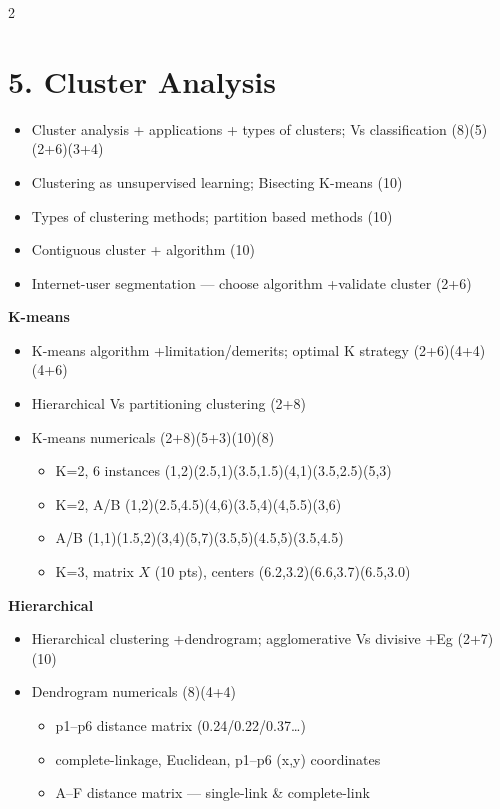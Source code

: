\documentclass[10pt]{article}
\begin{document}
\begin{multicols}{2}
\section*{5. Cluster Analysis}
\begin{itemize}
  \item Cluster analysis + applications + types of clusters; Vs classification \hfill (8)(5)(2+6)(3+4)
  \item Clustering as unsupervised learning; Bisecting K-means \hfill (10)
  \item Types of clustering methods; partition based methods \hfill (10)
  \item Contiguous cluster + algorithm \hfill (10)
  \item Internet-user segmentation --- choose algorithm +validate cluster \hfill (2+6)
\end{itemize}
\textbf{K-means}
\begin{itemize}
  \item K-means algorithm +limitation/demerits; optimal K strategy \hfill (2+6)(4+4)(4+6)
  \item Hierarchical Vs partitioning clustering \hfill (2+8)
  \item K-means numericals \hfill (2+8)(5+3)(10)(8)
    \begin{itemize}
      \item K=2, 6 instances (1,2)(2.5,1)(3.5,1.5)(4,1)(3.5,2.5)(5,3)
      \item K=2, A/B (1,2)(2.5,4.5)(4,6)(3.5,4)(4,5.5)(3,6)
      \item A/B (1,1)(1.5,2)(3,4)(5,7)(3.5,5)(4.5,5)(3.5,4.5)
      \item K=3, matrix $X$ (10 pts), centers (6.2,3.2)(6.6,3.7)(6.5,3.0)
    \end{itemize}
\end{itemize}
\textbf{Hierarchical}
\begin{itemize}
  \item Hierarchical clustering +dendrogram; agglomerative Vs divisive +Eg \hfill (2+7)(10)
  \item Dendrogram numericals \hfill (8)(4+4)
    \begin{itemize}
      \item p1--p6 distance matrix (0.24/0.22/0.37\dots)
      \item complete-linkage, Euclidean, p1--p6 (x,y) coordinates
      \item A--F distance matrix --- single-link \& complete-link
    \end{itemize}

\end{itemize}
\end{multicols}
\end{document}
